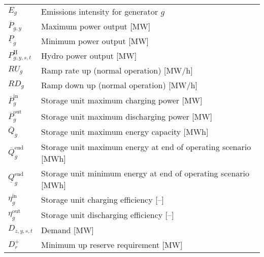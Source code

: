 \documentclass{article}
\newcommand{\iGenerator}{g}
\newcommand{\iYear}{y}
\newcommand{\iScenario}{s}
\newcommand{\iInterval}{t}
\newcommand{\iZone}{z}
\newcommand{\iRegion}{r}
\newcommand{\cEmissionsIntensity}[1][\iGenerator]{E_{#1}}
\newcommand{\cPowerOutputMax}[1][\iGenerator,\iYear]{\overline{P}_{#1}}
\newcommand{\cReserveUpRequirement}[1][\iRegion]{D^{+}_{#1}}
\newcommand{\cRampRateUp}[1][\iGenerator]{RU_{#1}}
\newcommand{\cRampRateDown}[1][\iGenerator]{RD_{#1}}
\newcommand{\cPowerOutputMin}[1][\iGenerator]{\underline{P}_{#1}}
\newcommand{\cPowerChargingMax}[1][\iGenerator]{\overline{P}^{\mathrm{in}}_{#1}}
\newcommand{\cPowerDischargingMax}[1][\iGenerator]{\overline{P}^{\mathrm{out}}_{#1}}
\newcommand{\cStorageUnitEnergyMax}[1][\iGenerator]{\overline{Q}_{#1}}
\newcommand{\cStorageUnitEnergyIntervalEndMax}[1][\iGenerator]{\overline{Q}^{\mathrm{end}}_{#1}}
\newcommand{\cStorageUnitEnergyIntervalEndMin}[1][\iGenerator]{\underline{Q}^{\mathrm{end}}_{#1}}
\newcommand{\cStorageUnitEfficiencyCharging}{\eta_{\iGenerator}^{\mathrm{in}}}
\newcommand{\cStorageUnitEfficiencyDischarging}{\eta_{\iGenerator}^{\mathrm{out}}}
\newcommand{\cDemand}[1][\iZone,\iYear,\iScenario,\iInterval]{D_{#1}}
\newcommand{\cPowerOutputHydro}[1][\iGenerator,\iYear,\iScenario,\iInterval]{P^{\mathrm{H}}_{#1}}
\begin{document}
\begin{longtable}{ p{}  p{}}
		$\cEmissionsIntensity$ & Emissions intensity for generator $\iGenerator$\\
		$\cPowerOutputMax$ & Maximum power output [MW]\\
		$\cPowerOutputMin$ & Minimum power output [MW]\\
		$\cPowerOutputHydro$ & Hydro power output [MW]\\
		$\cRampRateUp$ & Ramp rate up (normal operation) [MW/h]\\
		$\cRampRateDown$ & Ramp down up (normal operation) [MW/h]\\
		$\cPowerChargingMax$ & Storage unit maximum charging power [MW]\\
		$\cPowerDischargingMax$ & Storage unit maximum discharging power [MW]\\
		$\cStorageUnitEnergyMax$ & Storage unit maximum energy capacity [MWh]\\
		$\cStorageUnitEnergyIntervalEndMax$ & Storage unit maximum energy at end of operating scenario [MWh]\\
		$\cStorageUnitEnergyIntervalEndMin$ & Storage unit minimum energy at end of operating scenario [MWh]\\
		$\cStorageUnitEfficiencyCharging$ & Storage unit charging efficiency [--]\\
		$\cStorageUnitEfficiencyDischarging$ & Storage unit discharging efficiency [--]\\
		$\cDemand$ & Demand [MW]\\
		$\cReserveUpRequirement$ & Minimum up reserve requirement [MW]\\

\end{longtable}
\end{document}
